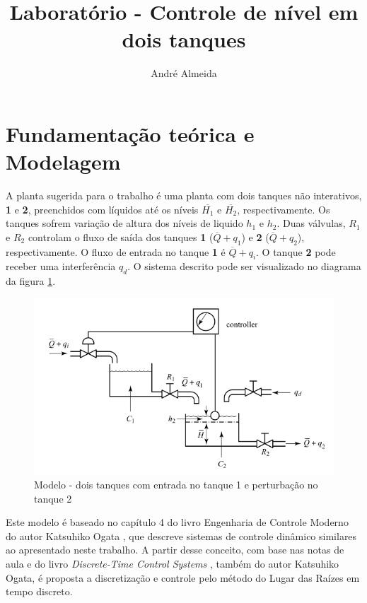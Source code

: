\documentclass[a4paper,11pt]{article}
\title{Laboratório - Controle de nível em dois tanques} %
\author{André Almeida}
\begin{document}


\renewcommand*\contentsname{Sumário}
\tableofcontents
\clearpage

\setcounter{page}{1}

\section{Fundamentação teórica e Modelagem}

A planta sugerida para o trabalho é uma planta com dois tanques não interativos, \textbf{1} e \textbf{2}, preenchidos com líquidos até os níveis $\overline{H_1}$ e $\overline{H_2}$, respectivamente. Os tanques sofrem variação de altura dos níveis de liquido $h_1$ e $h_2$. Duas válvulas, $R_1$ e $R_2$ controlam o fluxo de saída dos tanques \textbf{1} ($\overline{Q} + q_1$) e \textbf{2} ($\overline{Q} + q_2$), respectivamente. O fluxo de entrada no tanque \textbf{1} é $\overline{Q} + q_i$. O tanque \textbf{2} pode receber uma interferência $q_d$.
O sistema descrito pode ser visualizado no diagrama da figura \ref{fig:model}.

\begin{figure}[H]
    \centering
    \includegraphics[width=0.8\linewidth]{img/1modelagem/F1-2Tanques.PNG}
    \caption{Modelo - dois tanques com entrada no tanque 1 e perturbação no tanque 2}
    \label{fig:model}
\end{figure}

Este modelo é baseado no capítulo 4 do livro Engenharia de Controle Moderno do autor Katsuhiko Ogata \cite{ogatadinamico}, que descreve sistemas de controle dinâmico similares ao apresentado neste trabalho. A partir desse conceito, com base nas notas de aula e do livro \textit{Discrete-Time Control Systems} \cite{ogatadigital}, também do autor Katsuhiko Ogata, é proposta a discretização e controle pelo método do Lugar das Raízes em tempo discreto.
\end{document}
